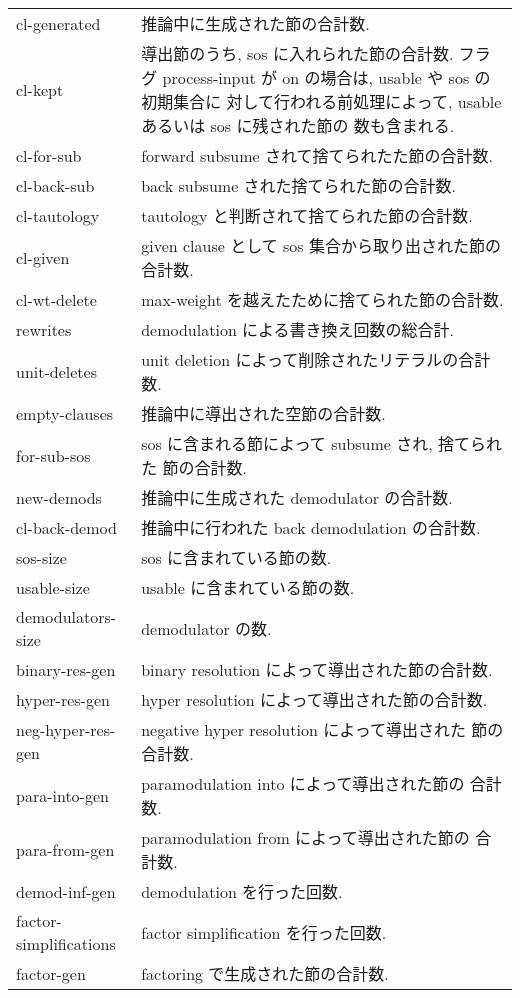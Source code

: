 \begin{tabular}[htcb]{l|p{}}\hline
cl-generated & 推論中に生成された節の合計数.  \\
cl-kept & 導出節のうち, sos に入れられた節の合計数. 
  フラグ process-input が on の場合は, usable や sos の初期集合に
  対して行われる前処理によって, usable あるいは sos に残された節の
  数も含まれる. \\
cl-for-sub & forward subsume されて捨てられたた節の合計数. \\
cl-back-sub & back subsume された捨てられた節の合計数. \\
cl-tautology & tautology と判断されて捨てられた節の合計数.\\
cl-given & given clause として sos 集合から取り出された節の合計数.\\
cl-wt-delete & max-weight を越えたために捨てられた節の合計数. \\
rewrites & demodulation による書き換え回数の総合計. \\
unit-deletes & unit deletion によって削除されたリテラルの合計数. \\
empty-clauses & 推論中に導出された空節の合計数.\\
for-sub-sos & sos に含まれる節によって subsume され, 捨てられた 
  節の合計数.\\
new-demods & 推論中に生成された demodulator の合計数. \\
cl-back-demod & 推論中に行われた back demodulation の合計数. \\
sos-size & sos に含まれている節の数. \\
usable-size & usable に含まれている節の数. \\
demodulators-size & demodulator の数. \\
binary-res-gen & binary resolution によって導出された節の合計数. \\
hyper-res-gen & hyper resolution によって導出された節の合計数. \\
neg-hyper-res-gen & negative hyper resolution によって導出された 
  節の合計数.\\
para-into-gen & paramodulation into によって導出された節の
  合計数. \\
para-from-gen & paramodulation from によって導出された節の
  合計数. \\
demod-inf-gen & demodulation を行った回数. \\
factor-simplifications & factor simplification を行った回数. \\
factor-gen & factoring で生成された節の合計数. \\ \hline
\end{tabular}

